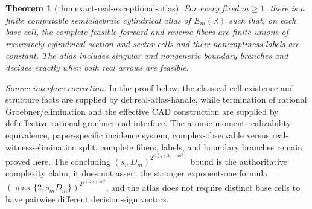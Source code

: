 \documentclass{article}
\newtheorem{theorem}{Theorem}
\begin{document}
\begin{theorem}[thm:exact-real-exceptional-atlas]\label{thm:exact-real-exceptional-atlas}
For every fixed $m\ge1$, there is a finite computable semialgebraic cylindrical atlas of $\bar E_m(\mathbb R)$ such that, on each base cell, the complete feasible forward and reverse fibers are finite unions of recursively cylindrical section and sector cells and their nonemptiness labels are constant. The atlas includes singular and nongeneric boundary branches and decides exactly when both real arrows are feasible.
\end{theorem}
\par\smallskip\noindent\emph{Source-interface correction.} In the proof below, the classical cell-existence and structure facts are supplied by def:real-atlas-handle, while termination of rational Groebner/elimination and the effective CAD construction are supplied by def:effective-rational-groebner-cad-interface. The atomic moment-realizability equivalence, paper-specific incidence system, complex-observable versus real-witness-elimination split, complete fibers, labels, and boundary branches remain proved here. The concluding $(s_mD_m)^{2^{O(q+2p+4n^2)}}$ bound is the authoritative complexity claim; it does not assert the stronger exponent-one formula $(\max\{2,s_mD_m\})^{2^{q+2p+4n^2}}$, and the atlas does not require distinct base cells to have pairwise different decision-sign vectors.
\end{document}
